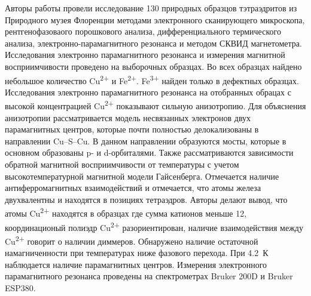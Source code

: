Авторы работы \cite{DiBenedetto2002} провели исследование 130  природных образцов тэтраэдритов из Природного музея Флоренции методами электронного сканирующего микроскопа, рентгенофазоваого порошкового анализа, дифференциального термического анализа, электронно-парамагнитного резонанса и методом СКВИД магнетометра. Исследования электронно парамагнитного резонанса и измерения магнитной восприимчивости проведено на выборочных образцах. Во всех образцах найдено небольшое количество Cu\textsuperscript{2+} и Fe\textsuperscript{2+}. Fe\textsuperscript{3+} найден только в дефектных образцах. Исследования электронно парамагнитного резонанса на отобранных обрацах с высокой концентрацией Cu\textsuperscript{2+} показывают сильную анизотропию. Для объяснения анизотропии рассматривается модель несвязанных электронов двух парамагнитных центров, которые почти полностью делокализованы в направлении Cu--S--Cu. В данном направлении образуются мосты, которые в основном образованы p- и d-орбиталями\cite{Albright_2013}. Также рассматриваются зависимости обратной магнитной восприимчивости от температуры с учетом высокотемпературной магнитной модели Гайсенберга. Отмечается наличие антиферромагнитных взаимодействий и отмечается, что атомы железа двухвалентны и находятся в позициях тетраэдров. Авторы делают вывод, что атомы Cu\textsuperscript{2+} находятся в образцах где сумма катионов меньше 12, координационый полиэдр Cu\textsuperscript{2+} разориентирован, наличие взаимодействия между Cu\textsuperscript{2+} говорит о наличии диммеров. Обнаружено наличие остаточной намагниченности при температурах ниже фазового перехода. При 4.2~К наблюдается наличие парамагнитных центров.  Измерения электронного парамагнитного резонанса проведены на спектрометрах Bruker 200D и Bruker ESP380.
 
